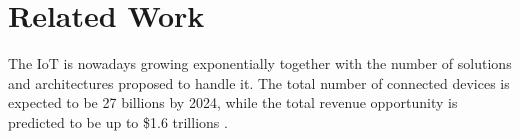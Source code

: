 \section{Related Work}
\label{sec:rel}

The IoT is nowadays growing exponentially together with the number of solutions and architectures proposed to handle it.
The total number of connected devices is expected to be 27 billions by 2024, while the total revenue opportunity is predicted to be up to \$1.6 trillions \cite{machina} .

